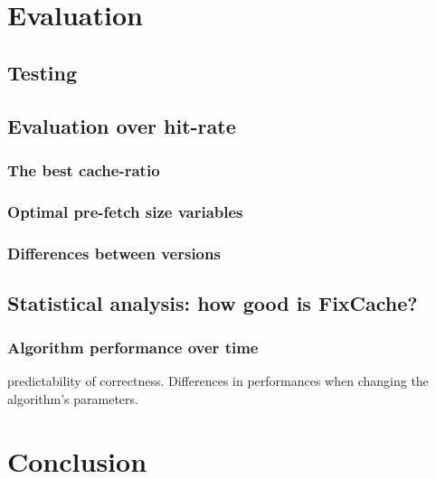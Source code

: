 \documentclass[12pt,twoside,notitlepage]{report}
\begin{document}
\chapter{Evaluation}
\section{Testing}
\section{Evaluation over hit-rate}
\subsection{The best cache-ratio}
\subsection{Optimal pre-fetch size variables}
\subsection{Differences between versions}
\section{Statistical analysis: how good is FixCache?}
\subsection{Algorithm performance over time} predictability of correctness. Differences in performances when changing the algorithm's parameters. 

\cleardoublepage
\chapter{Conclusion}

\cleardoublepage



\cleardoublepage

\appendix
\end{document}
